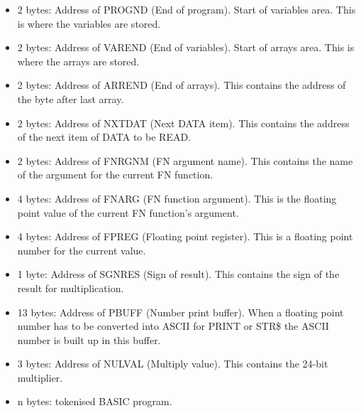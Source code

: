     \begin{itemize}
        \item 2 bytes: Address of PROGND (End of program). Start of variables
            area. This is where the variables are stored.
        \item 2 bytes: Address of VAREND (End of variables). Start of arrays
            area. This is where the arrays are stored.
        \item 2 bytes: Address of ARREND (End of arrays). This contains the
            address of the byte after last array.
        \item 2 bytes: Address of NXTDAT (Next DATA item). This contains the
            address of the next item of DATA to be READ.
        \item 2 bytes: Address of FNRGNM (FN argument name). This contains the
            name of the argument for the current FN function.
        \item 4 bytes: Address of FNARG (FN function argument). This is the
            floating point value of the current FN function's argument.
        \item 4 bytes: Address of FPREG (Floating point register). This is a
            floating point number for the current value.
        \item 1 byte: Address of SGNRES (Sign of result). This contains the sign
            of the result for multiplication.
        \item 13 bytes: Address of PBUFF (Number print buffer). When a floating
            point number has to be converted into ASCII for PRINT or STR\$ the
            ASCII number is built up in this buffer.
        \item 3 bytes: Address of NULVAL (Multiply value). This contains the
            24-bit multiplier.
        \item n bytes: tokenised BASIC program.
    \end{itemize}

